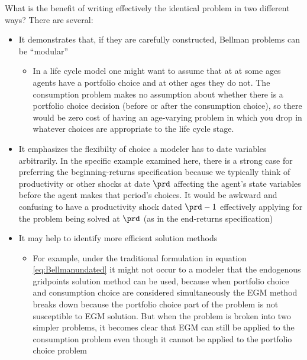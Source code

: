 \documentclass[titlepage, headings=optiontotocandhead]{econtex}
\begin{document}
What is the benefit of writing effectively the identical problem in two different ways?  There are several:
\begin{itemize}
\item It demonstrates that, if they are carefully constructed, Bellman problems can be ``modular''
  \begin{itemize}
  \item In a life cycle model one might want to assume that at at some ages agents have a portfolio choice and at other ages they do not. The consumption problem makes no assumption about whether there is a portfolio choice decision (before or after the consumption choice), so there would be zero cost of having an age-varying problem in which you drop in whatever choices are appropriate to the life cycle stage.
  \end{itemize}
\item It emphasizes the flexibilty of choice a modeler has to date variables arbitrarily.  In the specific example examined here, there is a strong case for preferring the beginning-returns specification because we typically think of productivity or other shocks at date $\prd$ affecting the agent's state variables before the agent makes that period's choices.  It would be awkward and confusing to have a productivity shock dated $\prd-1$ effectively applying for the problem being solved at $\prd$ (as in the end-returns specification)
\item It may help to identify more efficient solution methods
  \begin{itemize}
  \item For example, under the traditional formulation in equation \eqref{eq:Bellmanundated} it might not occur to a modeler that the endogenous gridpoints solution method can be used, because when portfolio choice and consumption choice are considered simultaneously the EGM method breaks down because the portfolio choice part of the problem is not susceptible to EGM solution.  But when the problem is broken into two simpler problems, it becomes clear that EGM can still be applied to the consumption problem even though it cannot be applied to the portfolio choice problem
  \end{itemize}
\end{itemize}

\end{document}
